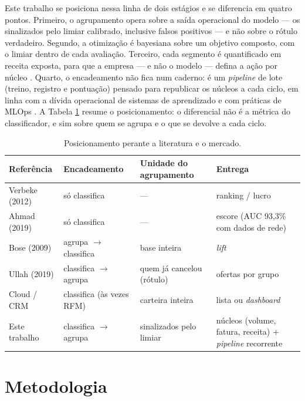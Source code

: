 \documentclass[12pt]{article}
\begin{document}
Este trabalho se posiciona nessa linha de dois estágios e se diferencia em
quatro pontos. Primeiro, o agrupamento opera sobre a saída operacional do
modelo --- os sinalizados pelo limiar calibrado, inclusive falsos positivos
--- e não sobre o rótulo verdadeiro. Segundo, a otimização é bayesiana
\cite{akiba2019} sobre um objetivo composto, com o limiar dentro de cada
avaliação. Terceiro, cada segmento é quantificado em receita exposta, para
que a empresa --- e não o modelo --- defina a ação por núcleo
\cite{hadden2007}. Quarto, o encadeamento não fica num caderno: é um
\textit{pipeline} de lote (treino, registro e pontuação) pensado para
republicar os núcleos a cada ciclo, em linha com a dívida operacional de
sistemas de aprendizado \cite{sculley2015} e com práticas de MLOps
\cite{kreuzberger2023}. A Tabela \ref{tab:relacionados} resume o
posicionamento: o diferencial não é a métrica do classificador, e sim sobre
quem se agrupa e o que se devolve a cada ciclo.

\begin{table}[ht]
\centering
\caption{Posicionamento perante a literatura e o mercado.}
\label{tab:relacionados}
\small
\begin{tabular}{|l|l|l|p{3.6cm}|}
\hline
\textbf{Referência} & \textbf{Encadeamento} & \textbf{Unidade do agrupamento} & \textbf{Entrega} \\
\hline
Verbeke (2012) & só classifica & --- & ranking / lucro \\ \hline
Ahmad (2019) & só classifica & --- & escore (AUC 93,3\% com dados de rede) \\ \hline
Bose (2009) & agrupa $\rightarrow$ classifica & base inteira & \textit{lift} \\ \hline
Ullah (2019) & classifica $\rightarrow$ agrupa & quem já cancelou (rótulo) & ofertas por grupo \\ \hline
Cloud / CRM & classifica (às vezes RFM) & carteira inteira & lista ou \textit{dashboard} \\ \hline
Este trabalho & classifica $\rightarrow$ agrupa & sinalizados pelo limiar & núcleos (volume, fatura, receita) + \textit{pipeline} recorrente \\
\hline
\end{tabular}
\end{table}

\section{Metodologia}
\label{sec:3}
\end{document}
